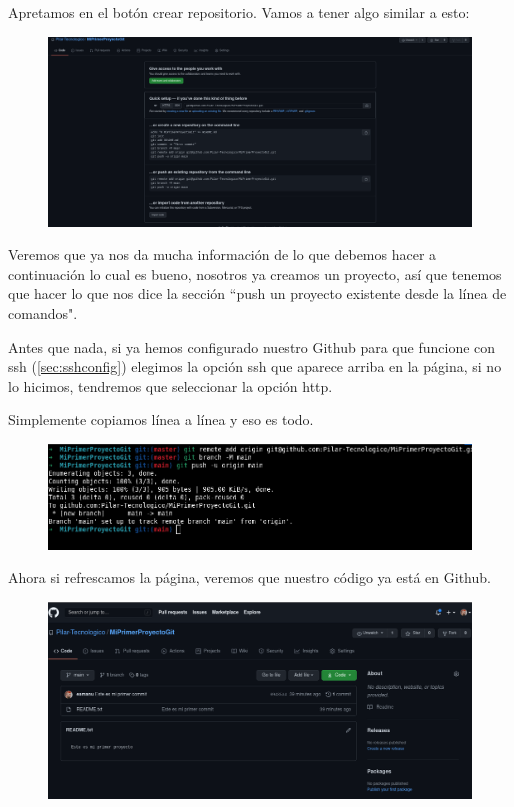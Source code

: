 \documentclass[a4paper]{article}
\begin{document}
Apretamos en el botón crear repositorio. Vamos a tener algo similar a esto:

\begin{figure}[H]
	\centering
	\includegraphics[width=0.7\linewidth]{img/miprimerproyecto10}
	\label{fig:miprimerproyecto10}
\end{figure}

Veremos que ya nos da mucha información de lo que debemos hacer a continuación
lo cual es bueno, nosotros ya creamos un proyecto, así que tenemos que hacer
lo que nos dice la sección ``push un proyecto existente desde la línea de comandos".

Antes que nada, si ya hemos configurado nuestro Github para que funcione con ssh
(\ref{sec:sshconfig}) elegimos la opción ssh que aparece arriba en la página, si
no lo hicimos, tendremos que seleccionar la opción http.

Simplemente copiamos línea a línea y eso es todo.

\begin{figure}[H]
	\centering
	\includegraphics[width=0.7\linewidth]{img/miprimerproyecto11}
	\label{fig:miprimerproyecto11}
\end{figure}

Ahora si refrescamos la página, veremos que nuestro código ya está en Github.

\begin{figure}[H]
	\centering
	\includegraphics[width=0.7\linewidth]{img/miprimerproyecto12}
	\label{fig:miprimerproyecto12}
\end{figure}
\end{document}
